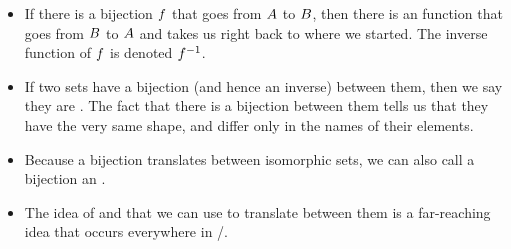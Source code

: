 \documentclass[../../../main.tex]{subfiles}
\begin{document}
\begin{itemize}

  \item If there is a bijection $f$ that goes from $A$ to $B$, then there is an  function that goes from $B$ to $A$ and takes us right back to where we started. The inverse function of $f$ is denoted $f^{-1}$.
  
  \item If two sets have a bijection (and hence an inverse) between them, then we say they are . The fact that there is a bijection between them tells us that they have the very same shape, and differ only in the names of their elements.
  
  \item Because a bijection translates between isomorphic sets, we can also call a bijection an . 
  
  \item The idea of  and  that we can use to translate between them is a far-reaching idea that occurs everywhere in \math/.

\end{itemize}
\end{document}
